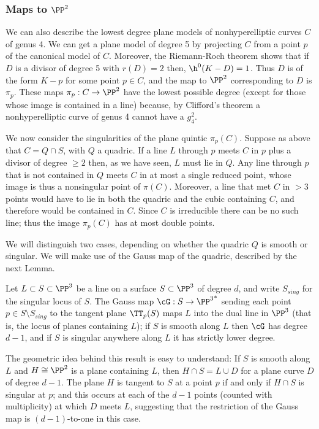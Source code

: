 \subsubsection{Maps to $\PP^2$}

We can also describe the lowest degree plane models of nonhyperelliptic curves $C$ of genus 4. 
We can get a plane model of degree 5 by projecting $C$ from a point $p$ of the canonical model of $C$.
Moreover, the Riemann-Roch theorem shows that if $D$ is a divisor of degree 5 with $r(D)=2$ then,  $\h^0(K-D) = 1$. Thus $D$ is of the form $K-p$ for some point $p \in C$, and the map to $\PP^2$ corresponding to $D$ is $\pi_p$. These  maps $\pi_p: C\to \PP^2$ have the lowest possible degree (except for those whose image is  contained in a line) because, by Clifford's theorem a nonhyperelliptic curve of genus 4 cannot have a $g^2_4$.

We now consider the singularities of the plane quintic $\pi_p(C)$. Suppose as above that $C = Q\cap S$, with $Q$ a quadric. If a line $L$ through $p$ meets $C$ in $p$ plus a divisor of degree $\geq 2$ then, as we have seen, $L$ must lie in $Q$.  Any line through $p$ that is not contained in $Q$ meets $C$ in at most a single reduced point,  whose image is thus a nonsingular point of $\pi(C)$. Moreover, a line that met $C$ in $>3$ points would have to lie in both the quadric and the cubic containing $C$, and therefore would be contained in $C$. Since $C$ is irreducible there can be no such line; thus the image $\pi_p(C)$ has at most double points.

We will distinguish two cases, depending on whether the quadric $Q$ is smooth or singular. We will make use of the Gauss map of the quadric, described by the next Lemma.

\begin{lemma}
Let $L \subset S \subset \PP^3$ be a line on a surface $S \subset \PP^3$ of degree $d$, and 
write $S_{sing}$ for the singular locus of $S$. The Gauss map $\cG : S \to {\PP^3}^*$ sending each point $p \in S\setminus S_{sing}$ to the tangent plane $\TT_p(S)$ maps $L$ into the dual line in $\PP^3$ (that is, the locus of planes containing $L$); if $S$ is smooth along $L$ then $\cG$  has degree $d-1$, and if $S$ is singular anywhere along $L$ it has strictly lower degree.
\end{lemma}

The geometric idea behind this result is easy to understand: If $S$ is smooth along $L$ and $H\cong \PP^{2}$ is a plane containing $L$, then $H\cap S = L \cup D$
for a plane curve $D$ of degree $d-1$. The plane $H$ is tangent to $S$  at a point $p$ if and only if
$H\cap S$ is singular at $p$; and this occurs at each of the $d-1$ points (counted with multiplicity)
at which $D$ meets $L$, suggesting that the restriction of the Gauss map is $(d-1)$-to-one in this case.

